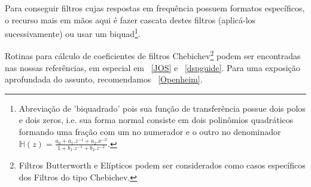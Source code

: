 \begin{itemize}
Para conseguir filtros cujas respostas em frequência possuem formatos específicos,
o recurso mais em mãos aqui é fazer cascata destes filtros (aplicá-los sucessivamente) ou usar um biquad\footnote{Abreviação
de 'biquadrado' pois sua função de transferência possue dois polos e dois zeros, i.e. sua
forma normal consiste em dois polinômios quadráticos formando uma fração com um no numerador e o outro no denominador
$\mathbb{H}(z)=\frac{a_0+a_1.z^{-1}+a_2.x^{-2}}{1+ b_1.z^{-1} +b_2 . z^{-2}}$.}.




Rotinas para cálculo de coeficientes
de filtros Chebichev\footnote{Filtros Butterworth e Elípticos podem
ser considerados como casos específicos dos Filtros do tipo Chebichev.} podem
ser encontradas nas nossas referências, em especial em ~\ref{JOS} e ~\ref{dspguide}.
Para uma exposição aprofundada do assunto, recomendamos ~\ref{Openheim}.

\end{itemize}

